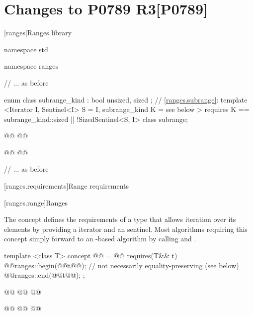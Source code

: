 
\part[Changes to P0789 R3]{Changes to P0789 R3\hfill[P0789]}\label{P0789}

\setcounter{chapter}{27}
[ranges]{Ranges library}



\begin{codeblock}
namespace std { namespace ranges {
  // ... as before

  enum class subrange_kind : bool { unsized, sized };
  // \ref{ranges.subrange}:
  template <Iterator I, Sentinel<I> S = I, subrange_kind K = see below >
      requires K == subrange_kind::sized || !SizedSentinel<S, I>
  class subrange;

  @@
    @@

  @@
    @@

  // ... as before
}}
\end{codeblock}

\setcounter{section}{5}
[ranges.requirements]{Range requirements}

\setcounter{subsection}{1}
[ranges.range]{Ranges}

\pnum
The  concept defines the requirements of a type that allows
iteration over its elements by providing a  iterator and an
 sentinel.
\enternote Most algorithms requiring this concept simply forward to an
-based algorithm by calling  and . \exitnote

\begin{itemdecl}
template <class T>
concept @@ = @\added{// \expos}@
  requires(T&& t) {
    @@ranges::begin(@@t@\added{)}@); // not necessarily equality-preserving (see below)
    @@ranges::end(@@t@\added{)}@);
  };

@@
@@
  @@

@@
@@
  @@
\end{itemdecl}


